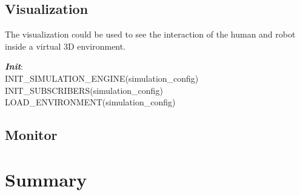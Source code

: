 \subsection{Visualization} The visualization could be used to see the interaction of the human and robot inside a virtual 3D environment.
\begin{algorithm}
 \textbf{\emph{Init}}:\\
 \quad INIT\_SIMULATION\_ENGINE(simulation\_config) \;
 \quad INIT\_SUBSCRIBERS(simulation\_config) \;
 \quad LOAD\_ENVIRONMENT(simulation\_config) \; 
\end{algorithm}

\subsection{Monitor}

\section{Summary}
